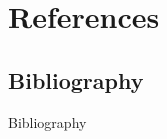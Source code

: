 \section*{References}

\subsection*{Bibliography}
\begin{frame}[allowframebreaks]{Bibliography}
    \printbibliography[heading=none]
\end{frame}
